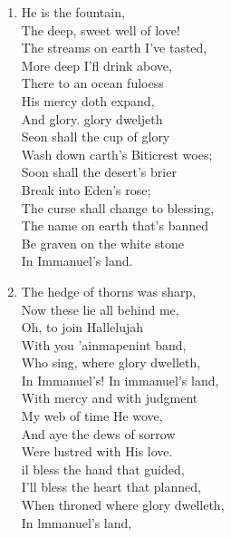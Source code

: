\documentclass[11pt,a4paper]{article}
\begin{document}
\begin{enumerate}
    \item He is the fountain, \\
        The deep, sweet well of love! \\
        The streams on earth I've tasted, \\
        More deep I'fl drink above, \\
        There to an ocean fuloess \\
        His mercy doth expand, \\
        And glory. glory dweljeth \\
        Seon shall the cup of glory \\
        Wash down carth's Biticrest woes; \\
        Soon shall the desert's brier \\
        Break into Eden's rose; \\
        The curse shall change to blessing, \\
        The name on earth that's banned \\
        Be graven on the white stone \\
        In Immanuel's land.

    \item The hedge of thorns was sharp, \\
        Now these lie all behind me, \\
        Oh, to join Hallelujah \\
        With you 'ainmapenint band, \\
        Who sing, where glory dwelleth, \\
        In Immanuel's! In immanuel's land, \\
        With mercy and with judgment \\
        My web of time He wove, \\
        And aye the dews of sorrow \\
        Were lustred with His love. \\
        il bless the hand that guided, \\
        I'll bless the heart that planned, \\
        When throned where glory dwelleth, \\
        In lmmanuel's land,


\end{enumerate}
\end{document}
